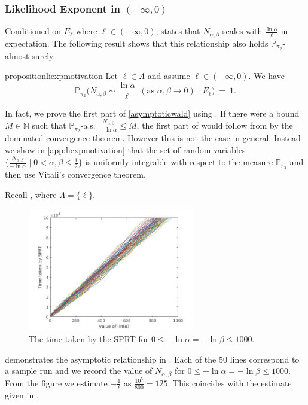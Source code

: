 \documentclass[a4paper,UKenglish,cleveref, autoref,mathscr]{lipics-v2019}
\newcommand{\NN}{\mathbb{N}}
\newcommand{\PP}{\mathbb{P}}
\newcommand{\1}{\mathbbm{1}}
\begin{document}
\subsubsection{Likelihood Exponent in $(-\infty, 0)$}
Conditioned on $E_\ell$ where $\ell \in (-\infty, 0)$,  states that $N_{\alpha, \beta}$ scales with $\frac{\ln \alpha}{\ell}$ in expectation.  The following result shows that this relationship also holds $\PP_{\pi_2}$-almost surely.
%
\begin{restatable}{proposition}{liexpmotivation}\label{liexpmotivation}
Let $\ell \in \Lambda$ and assume $\ell \in (-\infty, 0)$. We have
\begin{equation*}
\PP_{\pi_2}\Big( N_{\alpha,\beta} \sim \frac{\ln \alpha}{\ell} \ \ (\text{as } \alpha, \beta \rightarrow 0) \;\Big\vert\; E_{\ell}\Big) ~=~ 1.
\end{equation*}
\end{restatable}
%
In fact, we prove the first part of \cref{asymptoticwald} using .
If there were a bound $M \in \NN$ such that $\PP_{\pi_2}$-a.s.\ $\frac{N_{\alpha, \beta}}{- \ln \alpha} \leq M$, the first part of  would follow from  by the dominated convergence theorem.
However this is not the case in general.
Instead we show in \cref{app:liexpmotivation} that the set of random variables $\{\frac{N_{\alpha, \beta}}{-\ln \alpha}\mid 0 < \alpha, \beta \leq \frac12\}$ is uniformly integrable with respect to the measure $\PP_{\pi_2}$ and then use Vitali's convergence theorem.

\begin{example}
Recall , where $\Lambda = \{\ell\}$.
\begin{figure}[ht]
\begin{center}
\includegraphics[width=0.65\textwidth]{l100000_i50.jpg}	
\end{center}
\caption{The time taken by the SPRT for $0 \leq -\ln \alpha = -\ln \beta \leq 1000$.}\label{sprttimevslnalpha}
\end{figure}
 demonstrates the asymptotic relationship in . Each of the $50$ lines correspond to a sample run and we record the value of $N_{\alpha, \beta}$ for $0 \leq - \ln \alpha = - \ln \beta \leq 1000$. From the figure we estimate $-\frac{1}{\ell}$ as $\frac{10^5}{800} = 125$. This coincides with the estimate given in .
\end{example}
\end{document}
